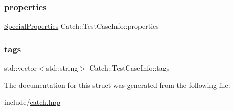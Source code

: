 \mbox{\label{struct_catch_1_1_test_case_info_afc1e84bd7a2e180895a06d9131302af0}} 
\subsubsection{\texorpdfstring{properties}{properties}}
{\footnotesize\ttfamily \mbox{\hyperlink{struct_catch_1_1_test_case_info_a39b232f74b4a7a6f2183b96759027eac}{Special\+Properties}} Catch\+::\+Test\+Case\+Info\+::properties}

\mbox{\label{struct_catch_1_1_test_case_info_a150a7cbca1dd0c91799ccb14ff822eb0}} 
\subsubsection{\texorpdfstring{tags}{tags}}
{\footnotesize\ttfamily std\+::vector$<$std\+::string$>$ Catch\+::\+Test\+Case\+Info\+::tags}



The documentation for this struct was generated from the following file\+:\begin{DoxyCompactItemize}
\item 
include/\mbox{\hyperlink{catch_8hpp}{catch.\+hpp}}\end{DoxyCompactItemize}
